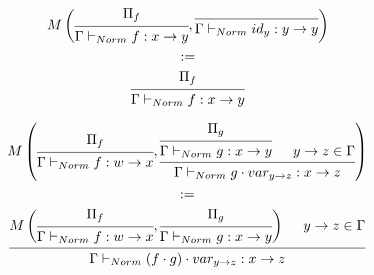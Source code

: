 \documentclass[conference]{IEEEtran}
\begin{document}
	\begin{equation*}
		\begin{gathered}
			M \left(
			\begin{prooftree}
				\hypo[]{\Pi_f}
				\infer1[]{\Gamma \vdash_{Norm} f : x \rightarrow y}
			\end{prooftree}
			,
			\begin{prooftree}
				\infer0[]{\Gamma \vdash_{Norm} id_y : y \rightarrow y}
			\end{prooftree}
			\right) \\
			:= \\
			\begin{prooftree}
				\hypo[]{\Pi_f}
				\infer1[]{\Gamma \vdash_{Norm} f : x \rightarrow y}
			\end{prooftree}
		\end{gathered}
	\end{equation*}
	\vspace{0pt}
	
	\begin{equation*}
		\begin{gathered}
			M \left(
			\begin{prooftree}
				\hypo[]{\Pi_f}
				\infer1[]{\Gamma \vdash_{Norm} f : w \rightarrow x}
			\end{prooftree}
			,
			\begin{prooftree}
				\hypo[]{\Pi_g}
				\infer1[]{\Gamma \vdash_{Norm} g : x \rightarrow y}
				\hypo[]{y \rightarrow z \in \Gamma}
				\infer2[]{\Gamma \vdash_{Norm} g \cdot var_{y \rightarrow z} : x \rightarrow z}
			\end{prooftree}
			\right) \\
			:= \\
			\begin{prooftree}
				\hypo[]{
					M \left(
					\begin{prooftree}
						\hypo[]{\Pi_f}
						\infer1[]{\Gamma \vdash_{Norm} f : w \rightarrow x}
					\end{prooftree}
					,
					\begin{prooftree}
						\hypo[]{\Pi_g}
						\infer1[]{\Gamma \vdash_{Norm} g : x \rightarrow y}
					\end{prooftree}
					\right)
				}
				\hypo[]{y \rightarrow z \in \Gamma}
				\infer2[]{\Gamma \vdash_{Norm} (f \cdot g) \cdot var_{y \rightarrow z} : x \rightarrow z}
			\end{prooftree}
		\end{gathered}
	\end{equation*}
	\vspace{10pt}
	
\end{document}
